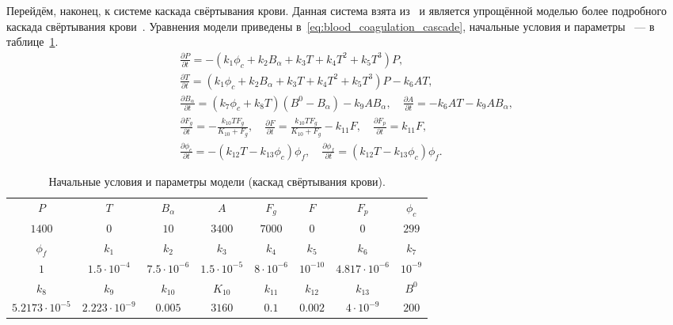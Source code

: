 Перейдём, наконец, к системе каскада свёртывания крови.
Данная система взята из~\cite{bouchnita2020mathematical, vassilevski2020parallel}
и является упрощённой моделью более подробного каскада свёртывания крови~\cite{panteleev2008coagulation, ushakova2018gemo}.
Уравнения модели приведены в~\eqref{eq:blood_coagulation_cascade}, начальные условия и параметры ~--- в таблице~\ref{tab:blood_coagulation_cascade}.
%
\begin{equation}
    \label{eq:blood_coagulation_cascade}
    \begin{aligned}
        \frac{\partial P}{\partial t} = - \left(k_1 \phi_c + k_2 B_\alpha + k_3 T + k_4 T^2 + k_5 T^3\right) P,
        \\
        \frac{\partial T}{\partial t} = \left(k_1 \phi_c + k_2 B_\alpha + k_3 T + k_4 T^2 + k_5 T^3 \right) P - k_6 A T,
        \\
        \frac{\partial B_\alpha}{\partial t} =  \left(k_7 \phi_c + k_8 T \right) \left( B^0 - B_\alpha \right) - k_9 A B_\alpha,
        \quad
        \frac{\partial A}{\partial t} = -k_6 A T - k_9 A B_\alpha,
        \\
        \frac{\partial F_g}{\partial t} = -\frac{k_{10} T F_g}{K_{10} + F_g},
        \quad
        \frac{\partial F}{\partial t} = \frac{k_{10} T F_g}{K_{10} + F_g} - k_{11} F,
        \quad
        \frac{\partial F_p} {\partial t} = k_{11} F,
        \\
        \frac{\partial \phi_c}{\partial t}  = - \left( k_{12} T - k_{13} \phi_c \right) \phi_f,
        \quad
        \frac{\partial \phi_f}{\partial t} = \left( k_{12} T - k_{13} \phi_c \right) \phi_f.
    \end{aligned}
\end{equation}

\begin{table}[ht!]
	\centering
	\begin{tabular}{cccccccc}
		\hline
		$ P $ & $ T $ & $ B_{\alpha} $ & $ A $ & $ F_g $ & $ F $ & $ F_p $ & $ \phi_c $  \\
		$ 1400 $ & $ 0 $ & $ 10 $ & $ 3400 $ & $ 7000 $ & $ 0 $ & $ 0 $ & $ 299 $  \\
		\hline
		 $ \phi_f $ & $ k_1 $ & $ k_2 $ & $ k_3 $ & $ k_4 $ & $ k_5 $ & $ k_6 $ & $ k_7 $   \\
		$ 1 $   & $ 1.5 \cdot 10^{-4} $ & $ 7.5 \cdot 10^{-6} $ & $ 1.5 \cdot 10^{-5} $ & $ 8 \cdot 10^{-6} $ & $ 10^{-10} $ & $ 4.817 \cdot 10^{-6} $ & $ 10^{-9} $ \\
		\hline
		$ k_8 $ & $ k_9 $ & $ k_{10} $ & $ K_{10} $ & $ k_{11} $ & $ k_{12} $ & $ k_{13} $ & $ B^0 $ \\
		 $ 5.2173 \cdot 10^{-5} $  & $ 2.223 \cdot 10^{-9} $ & $ 0.005 $ & $ 3160 $ & $ 0.1 $ & $ 0.002 $ & $ 4 \cdot 10^{-9} $ & $ 200 $ \\
		\hline
	\end{tabular}
    \caption{Начальные условия и параметры модели (каскад свёртывания крови).}
	\label{tab:blood_coagulation_cascade}
\end{table}

